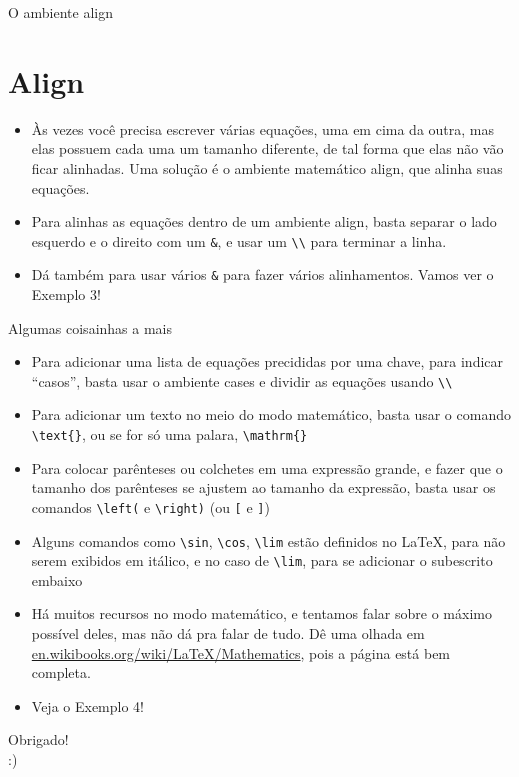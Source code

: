 \documentclass[12pt]{beamer}
\begin{document}
\begin{frame}[fragile]{O ambiente align}
  \section{Align}
  \begin{itemize}
    \item Às vezes você precisa escrever várias equações, uma em cima da outra, mas elas possuem cada uma um tamanho diferente, de tal forma que elas não vão ficar alinhadas. Uma solução é o ambiente matemático align, que alinha suas equações.
    \item Para alinhas as equações dentro de um ambiente align, basta separar o lado esquerdo e o direito com um \verb+&+, e usar um \verb+\\+ para terminar a linha.
    \item Dá também para usar vários \verb+&+ para fazer vários alinhamentos. Vamos ver o Exemplo 3!
  \end{itemize}

\end{frame}

\begin{frame}[fragile]{Algumas coisainhas a mais}
  \begin{itemize}
    \item Para adicionar uma lista de equações precididas por uma chave, para indicar ``casos'', basta usar o ambiente cases e dividir as equações usando \verb+\\+
    \item Para adicionar um texto no meio do modo matemático, basta usar o comando \verb+\text{}+, ou se for só uma palara, \verb+\mathrm{}+
    \item Para colocar parênteses ou colchetes em uma expressão grande, e fazer que o tamanho dos parênteses se ajustem ao tamanho da expressão, basta usar os comandos \verb+\left(+ e \verb+\right)+ (ou \verb+[+ e \verb+]+)
  \end{itemize}
\end{frame}

\begin{frame}[fragile]
  \begin{itemize}
    \item Alguns comandos como \verb+\sin+, \verb+\cos+, \verb+\lim+ estão definidos no \LaTeX, para não serem exibidos em itálico, e no caso de \verb+\lim+, para se adicionar o subescrito embaixo
    \item Há muitos recursos no modo matemático, e tentamos falar sobre o máximo possível deles, mas não dá pra falar de tudo. Dê uma olhada em \url{en.wikibooks.org/wiki/LaTeX/Mathematics},
    pois a página está bem completa.
    \item Veja o Exemplo 4!
  \end{itemize}
\end{frame}

\begin{frame}
  \begin{center}
    \large Obrigado!\\
    :)
  \end{center}
\end{frame}
\end{document}
